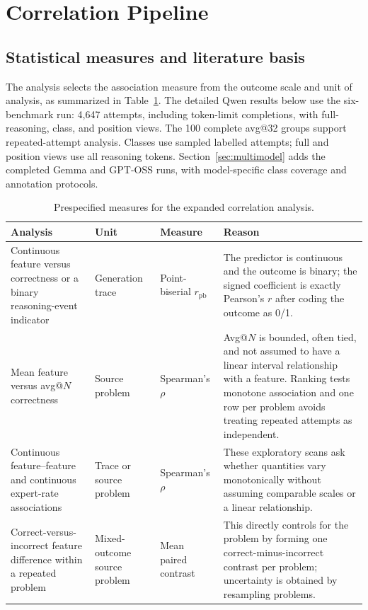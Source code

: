 \section{Correlation Pipeline}

\subsection{Statistical measures and literature basis}
\label{sec:qwen-corr-metrics}

The analysis selects the association measure from the outcome scale and
unit of analysis, as summarized in Table~\ref{tab:qwen-corr-metrics}.
The detailed Qwen results below use the six-benchmark run: 4,647 attempts, including token-limit completions, with full-reasoning,
class, and position views. The 100 complete avg@32 groups support
repeated-attempt analysis. Classes use sampled labelled attempts; full and
position views use all reasoning tokens.
Section~\ref{sec:multimodel} adds the completed Gemma and GPT-OSS runs,
with model-specific class coverage and annotation protocols.

\begin{table}[t]
\centering
\small
\caption{Prespecified measures for the expanded correlation analysis.}
\label{tab:qwen-corr-metrics}
\begin{tabular}{@{}p{}p{}p{}p{}@{}}
\toprule
Analysis & Unit & Measure & Reason \\
\midrule
Continuous feature versus correctness or a binary reasoning-event indicator
& Generation trace
& Point-biserial $r_{\mathrm{pb}}$
& The predictor is continuous and the outcome is binary; the signed
coefficient is exactly Pearson's $r$ after coding the outcome as 0/1. \\

Mean feature versus avg@$N$ correctness
& Source problem
& Spearman's $\rho$
& Avg@$N$ is bounded, often tied, and not assumed to have a linear interval
relationship with a feature.  Ranking tests monotone association and one row
per problem avoids treating repeated attempts as independent. \\

Continuous feature--feature and continuous expert-rate associations
& Trace or source problem
& Spearman's $\rho$
& These exploratory scans ask whether quantities vary monotonically without
assuming comparable scales or a linear relationship. \\

Correct-versus-incorrect feature difference within a repeated problem
& Mixed-outcome source problem
& Mean paired contrast
& This directly controls for the problem by forming one correct-minus-incorrect
contrast per problem; uncertainty is obtained by resampling problems. \\
\bottomrule
\end{tabular}
\end{table}


